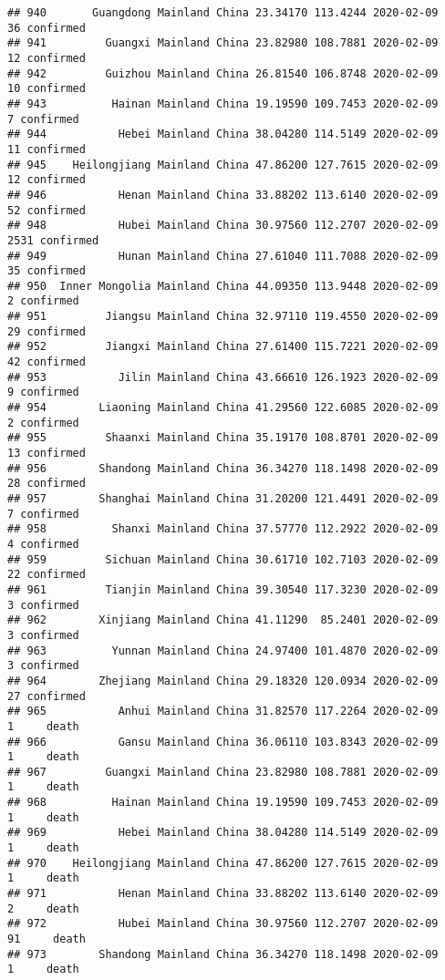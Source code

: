 \documentclass[
]{article}
\begin{document}
\begin{verbatim}
## 940       Guangdong Mainland China 23.34170 113.4244 2020-02-09    36 confirmed
## 941         Guangxi Mainland China 23.82980 108.7881 2020-02-09    12 confirmed
## 942         Guizhou Mainland China 26.81540 106.8748 2020-02-09    10 confirmed
## 943          Hainan Mainland China 19.19590 109.7453 2020-02-09     7 confirmed
## 944           Hebei Mainland China 38.04280 114.5149 2020-02-09    11 confirmed
## 945    Heilongjiang Mainland China 47.86200 127.7615 2020-02-09    12 confirmed
## 946           Henan Mainland China 33.88202 113.6140 2020-02-09    52 confirmed
## 948           Hubei Mainland China 30.97560 112.2707 2020-02-09  2531 confirmed
## 949           Hunan Mainland China 27.61040 111.7088 2020-02-09    35 confirmed
## 950  Inner Mongolia Mainland China 44.09350 113.9448 2020-02-09     2 confirmed
## 951         Jiangsu Mainland China 32.97110 119.4550 2020-02-09    29 confirmed
## 952         Jiangxi Mainland China 27.61400 115.7221 2020-02-09    42 confirmed
## 953           Jilin Mainland China 43.66610 126.1923 2020-02-09     9 confirmed
## 954        Liaoning Mainland China 41.29560 122.6085 2020-02-09     2 confirmed
## 955         Shaanxi Mainland China 35.19170 108.8701 2020-02-09    13 confirmed
## 956        Shandong Mainland China 36.34270 118.1498 2020-02-09    28 confirmed
## 957        Shanghai Mainland China 31.20200 121.4491 2020-02-09     7 confirmed
## 958          Shanxi Mainland China 37.57770 112.2922 2020-02-09     4 confirmed
## 959         Sichuan Mainland China 30.61710 102.7103 2020-02-09    22 confirmed
## 961         Tianjin Mainland China 39.30540 117.3230 2020-02-09     3 confirmed
## 962        Xinjiang Mainland China 41.11290  85.2401 2020-02-09     3 confirmed
## 963          Yunnan Mainland China 24.97400 101.4870 2020-02-09     3 confirmed
## 964        Zhejiang Mainland China 29.18320 120.0934 2020-02-09    27 confirmed
## 965           Anhui Mainland China 31.82570 117.2264 2020-02-09     1     death
## 966           Gansu Mainland China 36.06110 103.8343 2020-02-09     1     death
## 967         Guangxi Mainland China 23.82980 108.7881 2020-02-09     1     death
## 968          Hainan Mainland China 19.19590 109.7453 2020-02-09     1     death
## 969           Hebei Mainland China 38.04280 114.5149 2020-02-09     1     death
## 970    Heilongjiang Mainland China 47.86200 127.7615 2020-02-09     1     death
## 971           Henan Mainland China 33.88202 113.6140 2020-02-09     2     death
## 972           Hubei Mainland China 30.97560 112.2707 2020-02-09    91     death
## 973        Shandong Mainland China 36.34270 118.1498 2020-02-09     1     death

\end{verbatim}
\end{document}
